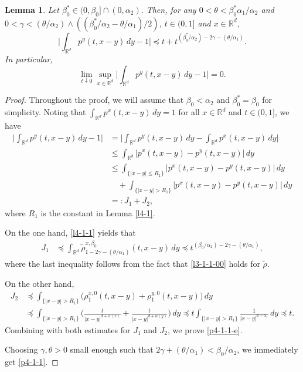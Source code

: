 \documentclass[a4paper,11pt]{amsart}
\renewcommand{\le}{\leqslant}
\newcommand{\R}{\mathds R}
\newcommand{\B}{\beta}
\newcommand{\T}{\theta}
\newcommand{\p}{\preceq}
\newcommand{\A}{\alpha}
\newcommand{\G}{\gamma}
\newtheorem{lemma}[theorem]{Lemma}
\theoremstyle{definition}
\begin{document}
\begin{lemma}\label{p4-1}  Let $\B_0^*\in(0,\B_0]\cap(0,{\alpha_2}).$  Then, for any $0<\theta<\B_0^*\A_1/\A_2$ and $0<\G<(\theta/\A_2)\wedge ((\B_0^*/\A_2-\theta/\A_1)/2)$, $t\in (0,1]$ and $x\in\R^d$,
\begin{equation}\label{p4-1-1-e}
\bigg|\int_{\R^d}p^y(t,x-y)\,dy-1\bigg|\p t+t^{(\B_0^*/{\A_2})-2\G-({\T}/{\A_1})}.
\end{equation}
In particular,
\begin{equation}\label{p4-1-1}
\lim_{t \downarrow 0}\sup_{x \in \R^d}\bigg|\int_{\R^d}p^y(t,x-y)\,dy-1\bigg|=0.
\end{equation}
\end{lemma}
\begin{proof} Throughout the proof, we will assume that $\B_0<\alpha_2$ and $\B_0^*=\B_0$ for simplicity.
Noting that $\int_{\R^d}p^x(t,x-y)\,dy=1$ for all $x\in \R^d$ and $t\in (0,1]$, we have
\begin{align*}
\bigg|\int_{\R^d}p^y(t,x-y)\,dy-1\bigg|&=\bigg|
\int_{\R^d}p^y(t,x-y)\,dy-\int_{\R^d}p^x(t,x-y)\,dy\bigg|\\
&\le \int_{\R^d}|p^x(t,x-y)-p^y(t,x-y)|\,dy\\
&\le \int_{\{|x-y|\le R_1\}}|p^x(t,x-y)-p^y(t,x-y)|\,dy\\
&\quad +\int_{\{|x-y|>R_1\}}|p^x(t,x-y)-p^y(t,x-y)|\,dy\\
&=:J_1+J_2,
\end{align*}
where $R_1$ is the constant in Lemma \ref{l4-1}.

On the one hand, \eqref{l4-1-1} yields that
\begin{align*}
J_1& \p \int_{\R^d} \tilde \rho^{x,\B_0}_{1-2\G-({\T}/{\A_1})}(t,x-y)\,dy\p t^{(\B_0/{\A_2})-2\G-({\T}/{\A_1})},
\end{align*}
where the last inequality follows from the fact that \eqref{l3-1-1-00} holds for $\tilde \rho$.

On the other hand,
\begin{align*}
J_2& \p \int_{\{|x-y|>R_1\}}\big(\rho^{x,0}_1(t,x-y)+\rho^{y,0}_1(t,x-y)\big)\,dy\\
&\p \int_{\{|x-y|>R_1\}}\bigg(\frac{t}{|x-y|^{d+\A(x)}}+\frac{t}{|x-y|^{d+\A(y)}}\bigg)\,dy\p t \int_{\{|x-y|>R_1\}}\frac{1}{|x-y|^{d+\A_1}}\,dy \p t.
\end{align*}
Combining with both estimates for $J_1$ and $J_2$, we prove \eqref{p4-1-1-e}.


Choosing $\G,\T>0$ small enough such that $2\G+({\T}/{\A_1})<{\B_0}/{\A_2}$, we immediately get \eqref{p4-1-1}.
\end{proof}
\end{document}
